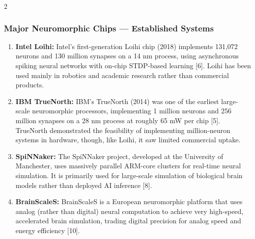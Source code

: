 \begin{multicols}{2}
  \subsubsection*{Major Neuromorphic Chips — Established Systems}
  \begin{enumerate}
    \item \textbf{Intel Loihi:} Intel's first-generation Loihi chip (2018) implements 131,072 neurons and 130 million synapses on a 14 nm process, using asynchronous spiking neural networks with on-chip STDP-based learning [6]. Loihi has been used mainly in robotics and academic research rather than commercial products.
    \item \textbf{IBM TrueNorth:} IBM's TrueNorth (2014) was one of the earliest large-scale neuromorphic processors, implementing 1 million neurons and 256 million synapses on a 28 nm process at roughly 65 mW per chip [5]. TrueNorth demonstrated the feasibility of implementing million-neuron systems in hardware, though, like Loihi, it saw limited commercial uptake.
    \item \textbf{SpiNNaker:} The SpiNNaker project, developed at the University of Manchester, uses massively parallel ARM-core clusters for real-time neural simulation. It is primarily used for large-scale simulation of biological brain models rather than deployed AI inference [8].
    \item \textbf{BrainScaleS:} BrainScaleS is a European neuromorphic platform that uses analog (rather than digital) neural computation to achieve very high-speed, accelerated brain simulation, trading digital precision for analog speed and energy efficiency [10].
  \end{enumerate}

\end{multicols}
